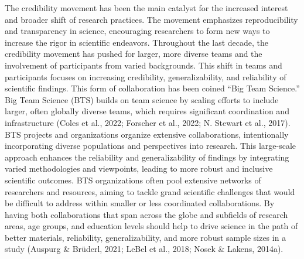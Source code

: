 \documentclass[
  man,floatsintext]{apa7}
\begin{document}
The credibility movement has been the main catalyst for the increased
interest and broader shift of research practices. The movement
emphasizes reproducibility and transparency in science, encouraging
researchers to form new ways to increase the rigor in scientific
endeavors. Throughout the last decade, the credibility movement has
pushed for larger, more diverse teams and the involvement of
participants from varied backgrounds. This shift in teams and
participants focuses on increasing credibility, generalizability, and
reliability of scientific findings. This form of collaboration has been
coined ``Big Team Science.'' Big Team Science (BTS) builds on team science
by scaling efforts to include larger, often globally diverse teams,
which requires significant coordination and infrastructure (Coles et al., 2022; Forscher et al., 2022; N. Stewart et al., 2017). BTS projects and organizations organize
extensive collaborations, intentionally incorporating diverse
populations and perspectives into research. This large-scale approach
enhances the reliability and generalizability of findings by integrating
varied methodologies and viewpoints, leading to more robust and
inclusive scientific outcomes. BTS organizations often pool extensive
networks of researchers and resources, aiming to tackle grand scientific
challenges that would be difficult to address within smaller or less
coordinated collaborations. By having both collaborations that span
across the globe and subfields of research areas, age groups, and
education levels should help to drive science in the path of better
materials, reliability, generalizability, and more robust sample sizes
in a study (Auspurg \& Brüderl, 2021; LeBel et al., 2018; Nosek \& Lakens, 2014a).
\end{document}

